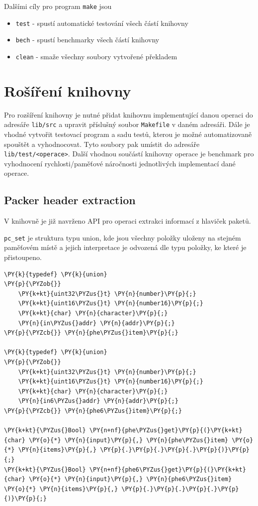 Dalšími cíly pro program \texttt{make} jsou

\begin{itemize}
	\item{\texttt{test} - spustí automatické testování všech částí knihovny}
	\item{\texttt{bech} - spustí benchmarky všech částí knihovny}
	\item{\texttt{clean} - smaže všechny soubory vytvořené překladem}
\end{itemize}

\section{Rošíření knihovny}

Pro rozšíření knihovny je nutné přidat knihovnu implementující danou operaci
do adresáře \texttt{lib/src} a upravit příslušný soubor \texttt{Makefile} v daném adresáři.
Dále je vhodné vytvořit testovací program a sadu testů, kterou je možné automatizovaně spouštět a vyhodnocovat.
Tyto soubory pak umístit do adresáře \texttt{lib/test/<operace>}.
Další vhodnou součástí knihovny operace je benchmark pro vyhodnocení rychlosti/paměťové náročnosti jednotlivých
implementací dané operace.

\subsection{Packer header extraction}
V knihovně je již navrženo API pro operaci extrakci informací z hlaviček paketů.

\texttt{pc\_set} je struktura typu union, kde jsou všechny položky uloženy na stejném paměťovém místě
a jejich interpretace je odvozená dle typu položky, ke které je přistoupeno.

\begin{Verbatim}[commandchars=\\\{\}]
\PY{k}{typedef} \PY{k}{union}
\PY{p}{\PYZob{}}
	\PY{k+kt}{uint32\PYZus{}t} \PY{n}{number}\PY{p}{;}
	\PY{k+kt}{uint16\PYZus{}t} \PY{n}{number16}\PY{p}{;}
	\PY{k+kt}{char} \PY{n}{character}\PY{p}{;}
	\PY{n}{in\PYZus{}addr} \PY{n}{addr}\PY{p}{;}
\PY{p}{\PYZcb{}} \PY{n}{phe\PYZus{}item}\PY{p}{;}

\PY{k}{typedef} \PY{k}{union}
\PY{p}{\PYZob{}}
	\PY{k+kt}{uint32\PYZus{}t} \PY{n}{number}\PY{p}{;}
	\PY{k+kt}{uint16\PYZus{}t} \PY{n}{number16}\PY{p}{;}
	\PY{k+kt}{char} \PY{n}{character}\PY{p}{;}
	\PY{n}{in6\PYZus{}addr} \PY{n}{addr}\PY{p}{;}
\PY{p}{\PYZcb{}} \PY{n}{phe6\PYZus{}item}\PY{p}{;}

\PY{k+kt}{\PYZus{}Bool} \PY{n+nf}{phe\PYZus{}get}\PY{p}{(}\PY{k+kt}{char} \PY{o}{*} \PY{n}{input}\PY{p}{,} \PY{n}{phe\PYZus{}item} \PY{o}{*} \PY{n}{items}\PY{p}{,} \PY{p}{.}\PY{p}{.}\PY{p}{.}\PY{p}{)}\PY{p}{;}
\PY{k+kt}{\PYZus{}Bool} \PY{n+nf}{phe6\PYZus{}get}\PY{p}{(}\PY{k+kt}{char} \PY{o}{*} \PY{n}{input}\PY{p}{,} \PY{n}{phe6\PYZus{}item} \PY{o}{*} \PY{n}{items}\PY{p}{,} \PY{p}{.}\PY{p}{.}\PY{p}{.}\PY{p}{)}\PY{p}{;}
\end{Verbatim}


